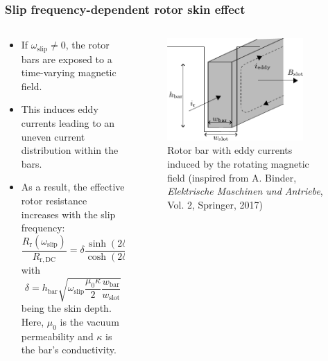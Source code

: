 \begin{frame}
	\frametitle{Slip frequency-dependent rotor skin effect}
    \begin{columns}
		\begin{column}{0.55\textwidth}
	      \begin{itemize}
            \item If $\omega_\mathrm{slip} \neq 0$, the rotor bars are exposed to a time-varying magnetic field.
            \item This induces eddy currents leading to an uneven current distribution within the bars.
            \item As a result, the effective rotor resistance increases with the slip frequency: \begin{equation}
                \frac{R_\mathrm{r}(\omega_\mathrm{slip})}{R_\mathrm{r,DC}} =  \delta \frac{\sinh(2 \delta) + \sin(2 \delta)}{\cosh(2\delta)-\cos(2 \delta)}
              \end{equation}
              with $$\delta = h_\mathrm{bar}\sqrt{\omega_\mathrm{slip} \frac{\mu_0 \kappa}{2}\frac{w_\mathrm{bar}}{w_\mathrm{slot}}}$$ being the skin depth. Here, $\mu_0$ is the vacuum permeability and $\kappa$ is the bar's conductivity.
          \end{itemize}
        \end{column}
        \begin{column}{0.45\textwidth}
            \begin{figure}
                \centering
                \includegraphics[width=0.85\textwidth]{fig/lec06/Eddy_currents_rotor_bar.pdf}
                \caption{Rotor bar with eddy currents induced by the rotating magnetic field (inspired from A. Binder, \textit{Elektrische Maschinen und Antriebe}, Vol. 2, Springer, 2017)}
                \label{fig:Eddy_currents_rotor_bar}
            \end{figure}
        \end{column}
    \end{columns}
\end{frame}

